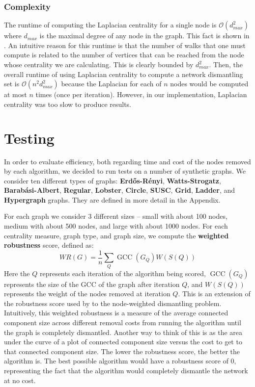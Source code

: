 \documentclass{article}
\DeclareMathOperator{\GCC}{GCC}
\begin{document}
\subsubsection{Complexity}
The runtime of computing the Laplacian centrality for a single node is $\mathcal{O}(d_{max}^2)$ where $d_{max}$ is the maximal degree of any node in the graph. This fact is shown in \cite{laplacian}. An intuitive reason for this runtime is that the number of walks that one must compute is related to the number of vertices that can be reached from the node whose centrality we are calculating. This is clearly bounded by $d_{max}^2$. Then, the overall runtime of using Laplacian centrality to compute a network dismantling set is $\mathcal{O}(n^2 d_{max}^2)$ because the Laplacian for each of $n$ nodes would be computed at most $n$ times (once per iteration). However, in our implementation, Laplacian centrality was too slow to produce results.

\section{Testing}
In order to evaluate efficiency, both regarding time and cost of the nodes removed by each algorithm, we decided to run tests on a number of synthetic graphs.
We consider ten different types of graphs: \textbf{Erd\H{o}s-Rényi}, \textbf{Watts-Strogatz}, \textbf{Barabási-Albert}, \textbf{Regular}, \textbf{Lobster}, \textbf{Circle}, \textbf{SUSC}, \textbf{Grid}, \textbf{Ladder}, and \textbf{Hypergraph} graphs. They are defined in more detail in the Appendix.

For each graph we consider 3 different sizes -- small with about 100 nodes, medium with about 500 nodes, and large with about 1000 nodes. For each centrality measure, graph type, and graph size, we compute the \textbf{weighted robustness} score, defined as:
$$WR(G) = \frac{1}{n}\sum_Q \GCC(G_Q)W(S(Q))$$
Here the $Q$ represents each iteration of the algorithm being scored, $\GCC(G_Q)$ represents the size of the GCC of the graph after iteration $Q$, and $W(S(Q))$ represents the weight of the nodes removed at iteration $Q$. This is an extension of the robustness score used by \cite{analysis} to the node-weighted dismantling problem. Intuitively, this weighted robustness is a measure of the average connected component size across different removal costs from running the algorithm until the graph is completely dismantled. Another way to think of this is as the area under the curve of a plot of connected component size versus the cost to get to that connected component size. The lower the robustness score, the better the algorithm is. The best possible algorithm would have a robustness score of 0, representing the fact that the algorithm would completely dismantle the network at no cost. \\
\end{document}
